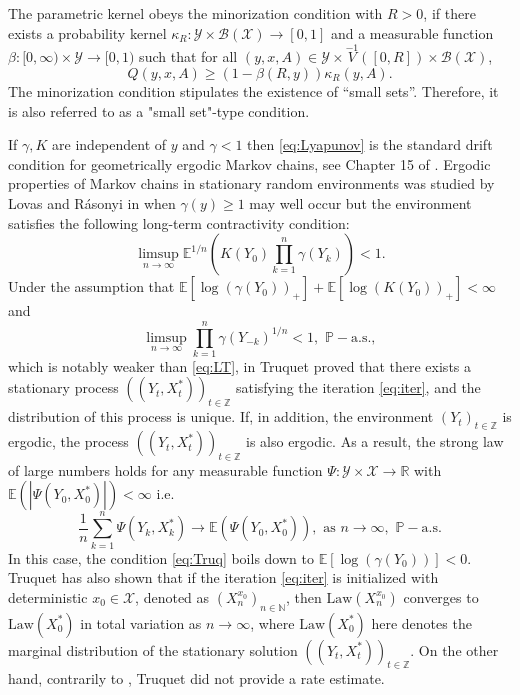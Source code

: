 \documentclass[a4paper,10pt]{article}
\newcommand{\N}{\mathbb{N}}
\newcommand{\Z}{\mathbb{Z}}
\newcommand{\R}{\mathbb{R}}
\newcommand{\B}{\mathcal{B}}
\newcommand{\X}{\mathcal{X}}
\newcommand{\Y}{\mathcal{Y}}
\renewcommand{\P}{\mathbb{P}}
\newcommand{\E}{\mathbb{E}}
\newcommand{\law}[1]{\text{Law}(#1)}
\newcommand{\Pas}{\text{a.s.}}
\newcommand{\ga}{\gamma}
\newcommand{\ka}{\kappa}
\begin{document}
The parametric kernel obeys the minorization condition with $R>0$, if there exists a probability kernel $\ka_R: \Y\times\B (\X)\to [0,1]$
and a measurable function $\beta:[0,\infty)\times\Y\to [0,1)$ such that for all
$(y,x,A)\in\Y\times\stackrel{-1}{V}([0,R])\times\B (\X)$,
\begin{equation}\label{eq:smallset}
Q(y,x,A)\ge (1-\beta (R,y))\ka_R (y,A). 
\end{equation}
The minorization condition stipulates the existence of ``small sets''. Therefore, it is also referred to as a "small set"-type condition.

\medskip
If $\ga,K$ are independent of $y$ and $\ga<1$ then \eqref{eq:Lyapunov} is the standard drift condition for geometrically ergodic Markov chains, see Chapter 15 of \cite{mt}. Ergodic properties of Markov chains in stationary random environments was studied by Lovas and R\'asonyi in \cite{lovas} when $\ga(y)\geq 1$ may well occur but the environment satisfies the following long-term contractivity condition:
\begin{equation}\label{eq:LT}
\limsup_{n\to\infty}\E^{1/n}\left(K(Y_0)\prod_{k=1}^{n}\ga (Y_k)\right) < 1.
\end{equation}
Under the assumption that $\E \left[\log (\ga (Y_0))_+\right]+\E \left[\log (K (Y_0))_+\right]<\infty$ and
\begin{equation}\label{eq:Truq}
	\limsup_{n\to\infty}\prod_{k=1}^{n}\ga (Y_{-k})^{1/n}<1,\,\,\P-\Pas,
\end{equation}
which is notably weaker than \eqref{eq:LT}, in \cite{Truquet1} Truquet proved that there exists a stationary process $((Y_t, X_t^\ast))_{t\in\Z}$ satisfying the iteration \eqref{eq:iter}, and the distribution of this process is unique.
If, in addition, the environment $(Y_t)_{t\in\Z}$ is ergodic, the process $((Y_t,X_t^\ast))_{t\in\Z}$ is also ergodic. As a result, the strong law of large numbers holds for any measurable function $\Psi:\Y\times\X\to\R$ with $\E (|\Psi (Y_0,X_0^\ast)|)<\infty$ i.e.
$$
\frac{1}{n}\sum_{k=1}^{n} \Psi (Y_k, X_k^\ast)\to \E (\Psi (Y_0,X_0^\ast)),\,\,\text{as}
\,\,n\to\infty,\,\,\P-\Pas
$$
In this case, the condition \eqref{eq:Truq} boils down to $\E \left[\log (\ga (Y_0))\right]<0$.
Truquet has also shown that if the iteration \eqref{eq:iter} is initialized with deterministic $x_0\in\X$, denoted as $(X_n^{x_0})_{n\in\N}$, then $\law{X_n^{x_0}}$ converges to
$\law{X_0^\ast}$ in total variation as $n\to\infty$, where $\law{X_0^\ast}$ here denotes the marginal distribution of the stationary solution $((Y_t, X_t^\ast))_{t\in\Z}$. On the other hand, contrarily to \cite{lovas}, Truquet did not provide a rate estimate. 
\end{document}
